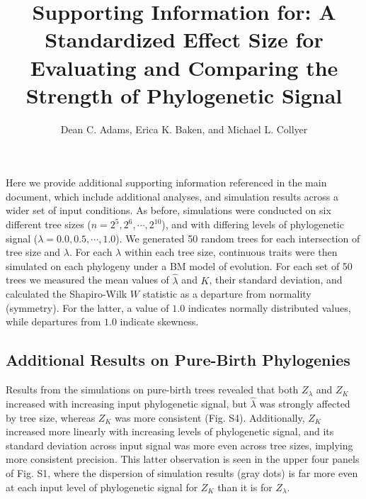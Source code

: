 \documentclass[
]{article}
\title{Supporting Information for: A Standardized Effect Size for Evaluating
and Comparing the Strength of Phylogenetic Signal}
\author{Dean C. Adams, Erica K. Baken, and Michael L. Collyer}
\date{}
\begin{document}
\maketitle

Here we provide additional supporting information referenced in the main
document, which include additional analyses, and simulation results
across a wider set of input conditions. As before, simulations were
conducted on six different tree sizes (\(n=2^5, 2^6, \cdots, 2^{10}\)),
and with differing levels of phylogenetic signal
(\(\lambda=0.0, 0.5, \cdots, 1.0\)). We generated 50 random trees for
each intersection of tree size and \(\lambda\). For each \(\lambda\)
within each tree size, continuous traits were then simulated on each
phylogeny under a BM model of evolution. For each set of 50 trees we
measured the mean values of \(\hat{\lambda}\) and \(K\), their standard
deviation, and calculated the Shapiro-Wilk \(W\) statistic as a
departure from normality (symmetry). For the latter, a value of \(1.0\)
indicates normally distributed values, while departures from \(1.0\)
indicate skewness.

\hypertarget{additional-results-on-pure-birth-phylogenies}{%
\subsection{Additional Results on Pure-Birth
Phylogenies}\label{additional-results-on-pure-birth-phylogenies}}

Results from the simulations on pure-birth trees revealed that both
\(Z_{\lambda}\) and \(Z_K\) increased with increasing input phylogenetic
signal, but \(\hat{\lambda}\) was strongly affected by tree size,
whereas \(Z_K\) was more consistent (Fig. S4). Additionally, \(Z_K\)
increased more linearly with increasing levels of phylogenetic signal,
and its standard deviation across input signal was more even across tree
sizes, implying more consistent precision. This latter observation is
seen in the upper four panels of Fig. S1, where the dispersion of
simulation results (gray dots) is far more even at each input level of
phylogenetic signal for \(Z_K\) than it is for \(Z_{\lambda}\).
\end{document}
